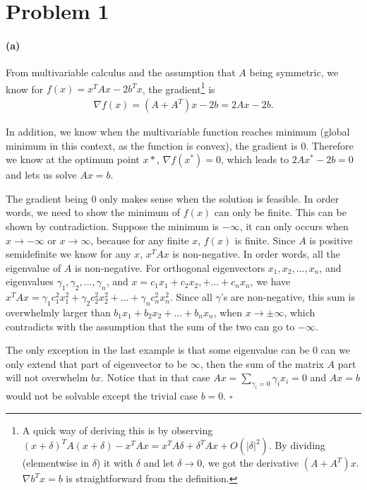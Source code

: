 \documentclass[12pt]{article}
\begin{document}
	
\section*{Problem 1}
\paragraph{(a)} From multivariable calculus and the assumption that $A$ being symmetric, we know for $f(x) = x^T Ax - 2 b^T x$, the gradient\footnote{A quick way of deriving this is by observing $(x + \delta)^TA(x + \delta) - x^T A x= x^TA\delta + \delta^TAx + O(|\delta|^2)$. By dividing (elementwise in $\delta$) it with $\delta$ and let $\delta \to 0$, we got the derivative $(A + A^T)x$. $\nabla b^Tx = b$ is straightforward from the definition.} is 
\begin{align*}
\nabla f(x) = (A + A^T)x - 2b = 2Ax - 2b.
\end{align*}

In addition, we know when the multivariable function reaches minimum (global minimum in this context, as the function is convex), the gradient is $0$. Therefore we know at the optimum point $x*$, $\nabla f(x^*) = 0$, which leads to $2Ax^*-2b = 0$ and lets us solve $Ax = b$. 

The gradient being $0$ only makes sense when the solution is feasible. In order words, we need to show the minimum of $f(x)$ can only be finite. This can be shown by contradiction. Suppose the minimum is $-\infty$, it can only occurs when $x\to -\infty$ or $x \to \infty$, because for any finite $x$, $f(x)$ is finite. Since $A$ is positive semidefinite we know for any $x$, $x^TAx$ is non-negative.  In order words, all the eigenvalue of $A$ is non-negative. For orthogonal eigenvectors $x_1, x_2, ..., x_n$, and eigenvalues $\gamma_1, \gamma_2, ..., \gamma_n$, and $x=c_1x_1 + c_2x_2, + ... + c_nx_n$, we have $x^TAx = \gamma_1 c_1^2x_1^2 + \gamma_2 c_2^2x_2^2 + ... + \gamma_n c_n^2 x_n^2$. Since all $\gamma$'s are non-negative, this sum is overwhelmly larger than $b_1x_1 + b_2x_2 + ... + b_nx_n$, when $x \to \pm\infty$, which contradicts with the assumption that the sum of the two can go to $-\infty$.

The only exception in the last example is that some eigenvalue can be $0$ can we only extend that part of eigenvector to be $\infty$, then the sum of the matrix $A$ part will not overwhelm $bx$. Notice that in that case $Ax = \sum_{\gamma_i=0}\gamma_ix_i =0$ and $Ax=b$ would not be solvable except the trivial case $b=0$. $\square$
\end{document}
